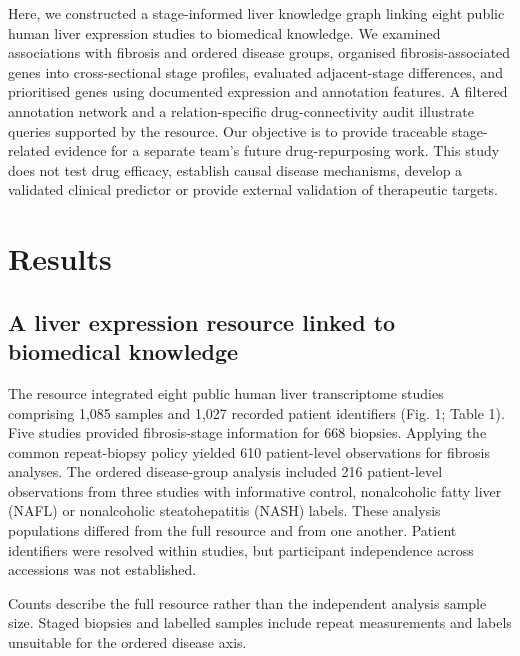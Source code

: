 \documentclass[11pt,a4paper]{article}
\begin{document}
Here, we constructed a stage-informed liver knowledge graph linking eight public human liver expression studies to biomedical knowledge. We examined associations with fibrosis and ordered disease groups, organised fibrosis-associated genes into cross-sectional stage profiles, evaluated adjacent-stage differences, and prioritised genes using documented expression and annotation features. A filtered annotation network and a relation-specific drug-connectivity audit illustrate queries supported by the resource. Our objective is to provide traceable stage-related evidence for a separate team's future drug-repurposing work. This study does not test drug efficacy, establish causal disease mechanisms, develop a validated clinical predictor or provide external validation of therapeutic targets.

\section*{Results}
\subsection*{A liver expression resource linked to biomedical knowledge}
The resource integrated eight public human liver transcriptome studies comprising 1,085 samples and 1,027 recorded patient identifiers (Fig. 1; Table 1). Five studies provided fibrosis-stage information for 668 biopsies. Applying the common repeat-biopsy policy yielded 610 patient-level observations for fibrosis analyses. The ordered disease-group analysis included 216 patient-level observations from three studies with informative control, nonalcoholic fatty liver (NAFL) or nonalcoholic steatohepatitis (NASH) labels. These analysis populations differed from the full resource and from one another. Patient identifiers were resolved within studies, but participant independence across accessions was not established.

Counts describe the full resource rather than the independent analysis sample size. Staged biopsies and labelled samples include repeat measurements and labels unsuitable for the ordered disease axis.
\end{document}
